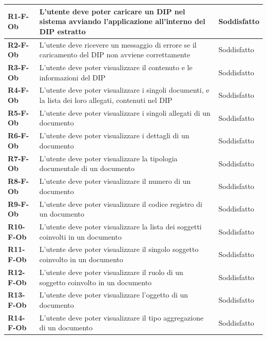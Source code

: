 \documentclass[a4paper,12pt]{article}
\begin{document}
{{\begin{longtable}{|>{\centering\arraybackslash}m{}|>{\centering\arraybackslash}m{}|>{\centering\arraybackslash}m{}|}
                \textbf{R1-F-Ob} & L'utente deve poter caricare un DIP nel sistema avviando l'applicazione all'interno del DIP estratto & 
                Soddisfatto \\
                \hline
                \textbf{R2-F-Ob} & L'utente deve ricevere un messaggio di errore se il caricamento del DIP non avviene correttamente & 
                Soddisfatto \\
                \hline
                \textbf{R3-F-Ob} & L'utente deve poter visualizzare il contenuto e le informazioni del DIP & Soddisfatto \\ 
                \hline
                \textbf{R4-F-Ob} & L'utente deve poter visualizzare i singoli documenti, e la lista dei loro allegati, contenuti nel DIP & 
                Soddisfatto \\ 
                \hline
                \textbf{R5-F-Ob} & L'utente deve poter visualizzare i singoli allegati di un documento & Soddisfatto \\ 
                \hline
                \textbf{R6-F-Ob} & L'utente deve poter visualizzare i dettagli di un documento & Soddisfatto \\ 
                \hline
                \textbf{R7-F-Ob} & L'utente deve poter visualizzare la tipologia documentale di un documento & Soddisfatto \\
                \hline
                \textbf{R8-F-Ob} & L'utente deve poter visualizzare il numero di un documento & Soddisfatto \\
                \hline
                \textbf{R9-F-Ob} & L'utente deve poter visualizzare il codice registro di un documento & Soddisfatto \\
                \hline
                \textbf{R10-F-Ob} & L'utente deve poter visualizzare la lista dei soggetti coinvolti in un documento & Soddisfatto \\ 
                \hline
                \textbf{R11-F-Ob} & L'utente deve poter visualizzare il singolo soggetto coinvolto in un documento & 
                Soddisfatto \\ 
                \hline
                \textbf{R12-F-Ob} & L'utente deve poter visualizzare il ruolo di un soggetto coinvolto in un documento & Soddisfatto \\ 
                \hline
                \textbf{R13-F-Ob} & L'utente deve poter visualizzare l'oggetto di un documento & Soddisfatto \\ 
                \hline
                \textbf{R14-F-Ob} & L'utente deve poter visualizzare il tipo aggregazione di un documento & Soddisfatto \\ 

\end{longtable}}}
\end{document}
